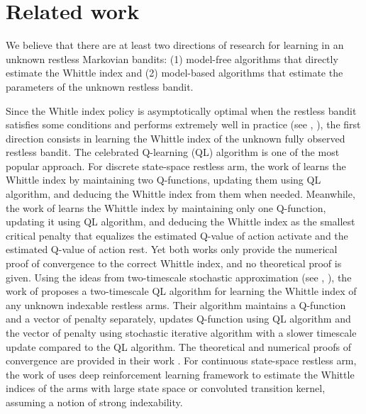 


\section{Related work}
\label{ch:restless:related}

We believe that there are at least two directions of research for learning in an unknown restless Markovian bandits: (1) model-free algorithms that directly estimate the Whittle index and (2) model-based algorithms that estimate the parameters of the unknown restless bandit.

Since the Whitle index policy is asymptotically optimal when the restless bandit satisfies some conditions \cite{weber1990index} and performs extremely well in practice (see \eg, \cite{glazebrook2002index, ansell2003whittle, glazebrook2006some}), 
the first direction consists in learning the Whittle index of the unknown fully observed restless bandit.
The celebrated Q-learning (QL) algorithm \cite{watkins1989learning} is one of the most popular approach.
For discrete state-space restless arm, the work of \cite{gibson2021novel} learns the Whittle index by maintaining two Q-functions, updating them using QL algorithm, and deducing the Whittle index from them when needed.
Meanwhile, the work of \cite{fu2019towards} learns the Whittle index by maintaining only one Q-function, updating it using QL algorithm, and deducing the Whittle index as the smallest critical penalty that equalizes the estimated Q-value of action activate and the estimated Q-value of action rest.
Yet both works \cite{gibson2021novel, fu2019towards} only provide the numerical proof of convergence to the correct Whittle index, and no theoretical proof is given.
Using the ideas from two-timescale stochastic approximation (see \eg, \cite{abounadi2001learning, schwartz1993reinforcement}), the work of \cite{avrachenkov2022whittle} proposes a two-timescale QL algorithm for learning the Whittle index of any unknown indexable restless arms. Their algorithm maintains a Q-function and a vector of penalty separately, updates Q-function using QL algorithm and the vector of penalty using stochastic iterative algorithm with a slower timescale update compared to the QL algorithm.
The theoretical and numerical proofs of convergence are provided in their work \cite{avrachenkov2022whittle}.
For continuous state-space restless arm, the work of \cite{nakhleh2021neurwin} uses deep reinforcement learning framework to estimate the Whittle indices of the arms with large state space or convoluted transition kernel, assuming a notion of strong indexability.

